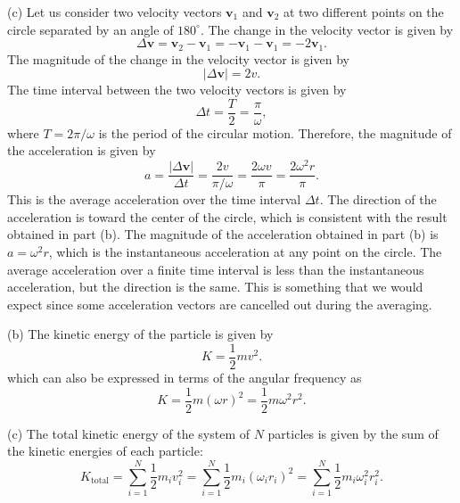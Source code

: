 \documentclass[12pt]{article}
\begin{document}
(c) Let us consider two velocity vectors $\mathbf{v}_1$ and $\mathbf{v}_2$ at two different points on the circle separated by an angle of $180^\circ$. The change in the velocity vector is given by
\begin{equation}
    \Delta \mathbf{v} = \mathbf{v}_2 - \mathbf{v}_1 = -\mathbf{v}_1 - \mathbf{v}_1 = -2\mathbf{v}_1.
\end{equation}
The magnitude of the change in the velocity vector is given by
\begin{equation}
    |\Delta \mathbf{v}| = 2v.
\end{equation} The time interval between the two velocity vectors is given by
\begin{equation}
    \Delta t = \frac{T}{2} = \frac{\pi}{\omega},
\end{equation}
where $T = 2\pi/\omega$ is the period of the circular motion. Therefore, the magnitude of the acceleration is given by
\begin{equation}
    a = \frac{|\Delta \mathbf{v}|}{\Delta t} = \frac{2v}{\pi/\omega} = \frac{2\omega v}{\pi} = \frac{2\omega^2 r}{\pi}.
\end{equation}
This is the average acceleration over the time interval $\Delta t$. The direction of the acceleration is toward the center of the circle, which is consistent with the result obtained in part (b). The magnitude of the acceleration obtained in part (b) is $a = \omega^2 r$, which is the instantaneous acceleration at any point on the circle. The average acceleration over a finite time interval is less than the instantaneous acceleration, but the direction is the same. This is something that we would expect since some acceleration vectors are cancelled out during the averaging.

(b) The kinetic energy of the particle is given by
\begin{equation}
    K = \frac{1}{2} m v^2.
\end{equation}
which can also be expressed in terms of the angular frequency as
\begin{equation}
    K = \frac{1}{2} m (\omega r)^2 = \frac{1}{2} m \omega^2 r^2.
\end{equation}

(c) The total kinetic energy of the system of $N$ particles is given by the sum of the kinetic energies of each particle:
\begin{equation}
    K_{\text{total}} = \sum_{i=1}^{N} \frac{1}{2} m_i v_i^2 = \sum_{i=1}^{N} \frac{1}{2} m_i (\omega_i r_i)^2 = \sum_{i=1}^{N} \frac{1}{2} m_i \omega_i^2 r_i^2.
\end{equation}
\end{document}
